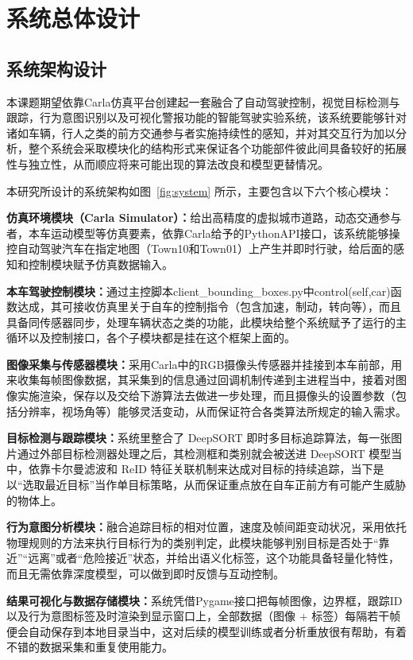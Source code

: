 \chapter{系统总体设计}

\section{系统架构设计}

本课题期望依靠Carla仿真平台创建起一套融合了自动驾驶控制，视觉目标检测与跟踪，行为意图识别以及可视化警报功能的智能驾驶实验系统，该系统要能够针对诸如车辆，行人之类的前方交通参与者实施持续性的感知，并对其交互行为加以分析，整个系统会采取模块化的结构形式来保证各个功能部件彼此间具备较好的拓展性与独立性，从而顺应将来可能出现的算法改良和模型更替情况。

本研究所设计的系统架构如图~\ref{fig:system} 所示，主要包含以下六个核心模块：

\textbf{仿真环境模块（Carla Simulator）：}给出高精度的虚拟城市道路，动态交通参与者，本车运动模型等仿真要素，依靠Carla给予的PythonAPI接口，该系统能够操控自动驾驶汽车在指定地图（Town10和Town01）上产生并即时行驶，给后面的感知和控制模块赋予仿真数据输入。

\textbf{本车驾驶控制模块：}通过主控脚本client\_bounding\_boxes.py中control(self,car)函数达成，其可接收仿真里关于自车的控制指令（包含加速，制动，转向等），而且具备同传感器同步，处理车辆状态之类的功能，此模块给整个系统赋予了运行的主循环以及控制接口，各个子模块都是挂在这个框架上面的。

\textbf{图像采集与传感器模块：}采用Carla中的RGB摄像头传感器并挂接到本车前部，用来收集每帧图像数据，其采集到的信息通过回调机制传递到主进程当中，接着对图像实施渲染，保存以及交给下游算法去做进一步处理，而且摄像头的设置参数（包括分辨率，视场角等）能够灵活变动，从而保证符合各类算法所规定的输入需求。

\textbf{目标检测与跟踪模块：}系统里整合了 DeepSORT 即时多目标追踪算法，每一张图片通过外部目标检测器处理之后，其检测框和类别就会被送进 DeepSORT 模型当中，依靠卡尔曼滤波和 ReID 特征关联机制来达成对目标的持续追踪，当下是以“选取最近目标”当作单目标策略，从而保证重点放在自车正前方有可能产生威胁的物体上。

\textbf{行为意图分析模块：}融合追踪目标的相对位置，速度及帧间距变动状况，采用依托物理规则的方法来执行目标行为的类别判定，此模块能够判别目标是否处于“靠近”“远离”或者“危险接近”状态，并给出语义化标签，这个功能具备轻量化特性，而且无需依靠深度模型，可以做到即时反馈与互动控制。

\textbf{结果可视化与数据存储模块：}系统凭借Pygame接口把每帧图像，边界框，跟踪ID以及行为意图标签及时渲染到显示窗口上，全部数据（图像 + 标签）每隔若干帧便会自动保存到本地目录当中，这对后续的模型训练或者分析重放很有帮助，有着不错的数据采集和重复使用能力。

